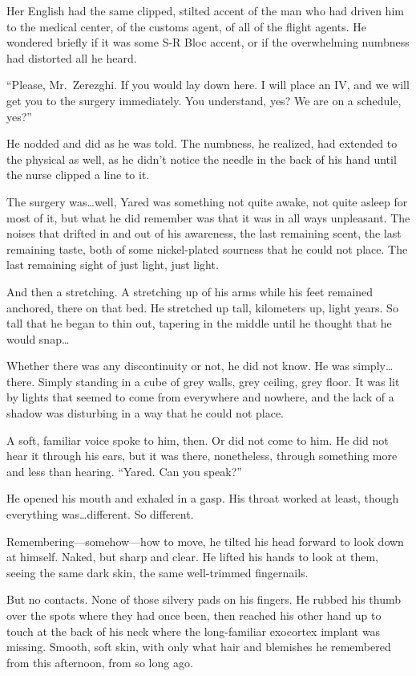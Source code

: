 Her English had the same clipped, stilted accent of the man who had driven him to the medical center, of the customs agent, of all of the flight agents. He wondered briefly if it was some S-R Bloc accent, or if the overwhelming numbness had distorted all he heard.

``Please, Mr.~Zerezghi. If you would lay down here. I will place an IV, and we will get you to the surgery immediately. You understand, yes? We are on a schedule, yes?''

He nodded and did as he was told. The numbness, he realized, had extended to the physical as well, as he didn't notice the needle in the back of his hand until the nurse clipped a line to it.

The surgery was\ldots well, Yared was something not quite awake, not quite asleep for most of it, but what he did remember was that it was in all ways unpleasant. The noises that drifted in and out of his awareness, the last remaining scent, the last remaining taste, both of some nickel-plated sourness that he could not place. The last remaining sight of just light, just light.

And then a stretching. A stretching up of his arms while his feet remained anchored, there on that bed. He stretched up tall, kilometers up, light years. So tall that he began to thin out, tapering in the middle until he thought that he would snap\ldots{}

Whether there was any discontinuity or not, he did not know. He was simply\ldots there. Simply standing in a cube of grey walls, grey ceiling, grey floor. It was lit by lights that seemed to come from everywhere and nowhere, and the lack of a shadow was disturbing in a way that he could not place.

A soft, familiar voice spoke to him, then. Or did not come to him. He did not hear it through his ears, but it was there, nonetheless, through something more and less than hearing. ``Yared. Can you speak?''

He opened his mouth and exhaled in a gasp. His throat worked at least, though everything was\ldots different. So different.

Remembering---somehow---how to move, he tilted his head forward to look down at himself. Naked, but sharp and clear. He lifted his hands to look at them, seeing the same dark skin, the same well-trimmed fingernails.

But no contacts. None of those silvery pads on his fingers. He rubbed his thumb over the spots where they had once been, then reached his other hand up to touch at the back of his neck where the long-familiar exocortex implant was missing. Smooth, soft skin, with only what hair and blemishes he remembered from this afternoon, from so long ago.

